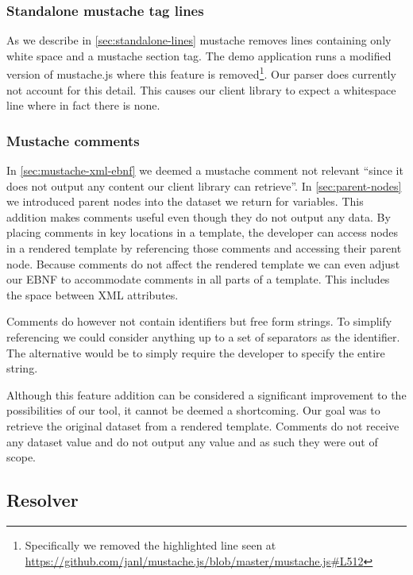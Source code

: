 \documentclass[thesis.tex]{subfiles}
\begin{document}
\subsubsection{Standalone mustache tag lines}
As we describe in \ref{sec:standalone-lines} mustache removes
lines containing only white space and a mustache section tag.
The demo application runs a modified version of mustache.js where this feature
is removed\footnote{
	Specifically we removed the highlighted line seen at
	\url{https://github.com/janl/mustache.js/blob/master/mustache.js\#L512}
}. Our parser does currently not account for this detail. This causes
our client library to expect a whitespace line where in fact there is none.

\subsubsection{Mustache comments}
\label{sec:comment-selectors}
In \ref{sec:mustache-xml-ebnf} we deemed a mustache comment not relevant
``since it does not output any content our client library can retrieve''.
In \ref{sec:parent-nodes} we introduced parent nodes into the dataset we return
for variables.
This addition makes comments useful even though they do not output any data.
By placing comments in key locations in a template, the developer can access
nodes in a rendered template by referencing those comments and accessing their
parent node. Because comments do not affect the rendered template we can even
adjust our EBNF to accommodate comments in all parts of a template.
This includes the space between XML attributes.

Comments do however not contain identifiers but free form strings.
To simplify referencing we could consider anything up to a set of
separators as the identifier. The alternative would be to simply require the
developer to specify the entire string.

Although this feature addition can be considered a significant improvement to
the possibilities of our tool, it cannot be deemed a shortcoming.
Our goal was to retrieve the original dataset from a rendered template.
Comments do not receive any dataset value and do not output any value and as
such they were out of scope.

\subsection{Resolver}
\end{document}
